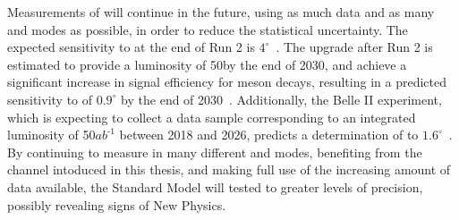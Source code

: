 Measurements of \Pgamma will continue in the future, using as much data and as many \B and \D modes as possible, in order to reduce the statistical uncertainty. The expected sensitivity to \Pgamma at the end of Run 2 is $4^{\circ}$~\cite{LHCb-PAPER-2012-031}. The upgrade after Run 2 is estimated to provide a luminosity of 50\invfb by the end of 2030, and achieve a significant increase in signal efficiency for \B meson decays, resulting in a predicted sensitivity to \Pgamma of $0.9^{\circ}$ by the end of 2030~\cite{LHCb-PAPER-2012-031}. Additionally, the Belle II experiment, which is expecting to collect a data sample corresponding to an integrated luminosity of 50$ab^{\text{-1}}$ between 2018 and 2026, predicts a determination of \Pgamma to $1.6^{\circ}$~\cite{BelleII}. By continuing to measure \Pgamma in many different \B and \D modes, benefiting from the \btodkst channel intoduced in this thesis, and making full use of the increasing amount of data available, the Standard Model will tested to greater levels of precision, possibly revealing signs of New Physics.

\clearpage
